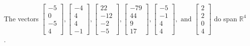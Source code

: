 \begin{exercise}
\begin{exerciseStatement}
  \end{exerciseStatement}
  \begin{exerciseAnswer}
   The vectors \(\left[\begin{array}{r}
-5 \\
0 \\
-5 \\
4
\end{array}\right] , \left[\begin{array}{r}
-4 \\
4 \\
4 \\
-1
\end{array}\right] , \left[\begin{array}{r}
22 \\
-12 \\
-2 \\
-5
\end{array}\right] , \left[\begin{array}{r}
-79 \\
44 \\
9 \\
17
\end{array}\right] , \left[\begin{array}{r}
-5 \\
-1 \\
4 \\
4
\end{array}\right] , \text{ and } \left[\begin{array}{r}
2 \\
2 \\
0 \\
4
\end{array}\right]\) 
  	 do  
	span \(\mathbb{R}^4\).
  


  \end{exerciseAnswer}
\end{exercise}